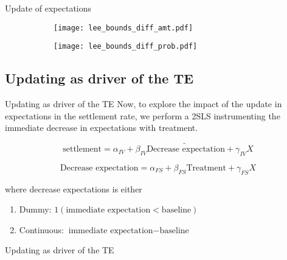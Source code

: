 \documentclass[8pt]{beamer}
\begin{document}
\begin{frame}{Update of expectations}

\begin{figure}[H]
    \begin{center}
        \begin{subfigure}{0.49\textwidth}
            \centering
            \texttt{[image: lee\_bounds\_diff\_amt.pdf]}
        \end{subfigure}
        \begin{subfigure}{0.49\textwidth}
                \centering
                \texttt{[image: lee\_bounds\_diff\_prob.pdf]}
        \end{subfigure}
    \end{center} 
\end{figure} 
 
 
\end{frame}


\subsection{Updating as driver of the TE}
\begin{frame}{Updating as driver of the TE}
Now, to explore the impact of the update in expectations in the settlement rate, we perform a 2SLS instrumenting the immediate decrease in expectations with treatment.

\[\text{settlement}=\alpha_{IV}+\beta_{IV}\widetilde{\text{Decrease expectation}}+\gamma_{IV}X\]

\[\text{Decrease expectation}=\alpha_{FS}+\beta_{FS}\text{Treatment}+\gamma_{FS}X\]

where decrease expectations is either
\begin{enumerate}
    \item Dummy: $1(\text{immediate expectation}<\text{baseline})$
    \item Continuous: $\text{immediate expectation}-\text{baseline}$
\end{enumerate}
\end{frame}

\begin{frame}{Updating as driver of the TE}

\begin{table}[H]
\caption{Immediate updating in 2M settlement}
\begin{center}
\tiny{}
\end{center}
\end{table}     
\end{frame}
\end{document}
